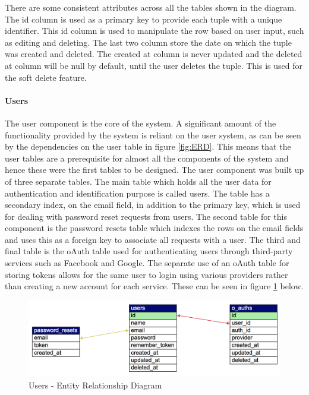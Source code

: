 There are some consistent attributes across all the tables shown in the diagram. The id column is used as a primary key to provide each tuple with a unique identifier. This id column is used to manipulate the row based on user input, such as editing and deleting. The last two column store the date on which the tuple was created and deleted. The created at column is never updated and the deleted at column will be null by default, until the user deletes the tuple. This is used for the soft delete feature.

\paragraph{Users} The user component is the core of the system. A significant amount of the functionality provided by the system is reliant on the user system, as can be seen by the dependencies on the user table in figure \ref{fig:ERD}. This means that the user tables are a prerequisite for almost all the components of the system and hence these were the first tables to be designed. The user component was built up of three separate tables. The main table which holds all the user data for authentication and identification purpose is called users. The table has a secondary index, on the email field, in addition to the primary key, which is used for dealing with password reset requests from users. The second table for this component is the password resets table which indexes the rows on the email fields and uses this as a foreign key to associate all requests with a user. The third and final table is the oAuth table used for authenticating users through third-party services such as Facebook and Google. The separate use of an oAuth table for storing tokens allows for the same user to login using various providers rather than creating a new account for each service. These can be seen in figure \ref{fig:ERD_User} below.

\begin{figure}[H]
	\centering
	\includegraphics[width=1.0\textwidth]{images/Database/ERD_User}
	\caption{Users - Entity Relationship Diagram} \label{fig:ERD_User}
\end{figure}


